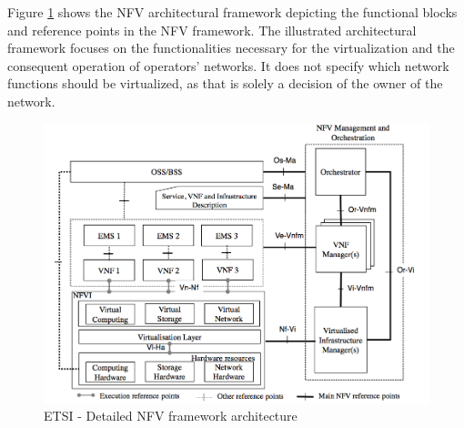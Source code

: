 Figure \ref{fig:etsi_detailed_nfv_framework} shows the NFV architectural framework depicting the functional blocks and reference points in the NFV framework. The illustrated architectural framework focuses on the functionalities necessary for the virtualization and the consequent operation of operators' networks. It does not specify which network functions should be virtualized, as that is solely a decision of the owner of the network.
\begin{figure}[h]
	\centering
	\includegraphics[clip= true, width= \columnwidth]{images/architettura_etsi.png}
	\caption{ETSI - Detailed NFV framework architecture}
	\label{fig:etsi_detailed_nfv_framework}
\end{figure}

